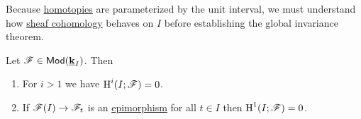 \documentclass[../../main]{subfiles}
\begin{document}
Because \hyperref[def:homotopy-over]{homotopies} are parameterized by the unit interval, we must understand how \hyperref[def:sheaf-cohomology]{sheaf cohomology} behaves on \(I\) before establishing the global invariance theorem.

\begin{lemma}\label{lemma:vanishing-cohomology-interval}
  Let \(\mathscr{F} \in \mathsf{Mod}(\underline{\mathbf{k}}_{I})\). Then
  \begin{enumerate}
    \item For \(i > 1\) we have \(\operatorname{H}^{i}(I; \mathscr{F}) = 0\).
    \item If \(\mathscr{F}(I) \to \mathscr{F}_{t}\) is an \hyperref[def:mono-epi-morphism]{epimorphism} for all \(t \in I\) then \(\operatorname{H}^{1}(I; \mathscr{F}) = 0\).
  \end{enumerate}
\end{lemma}
\end{document}
